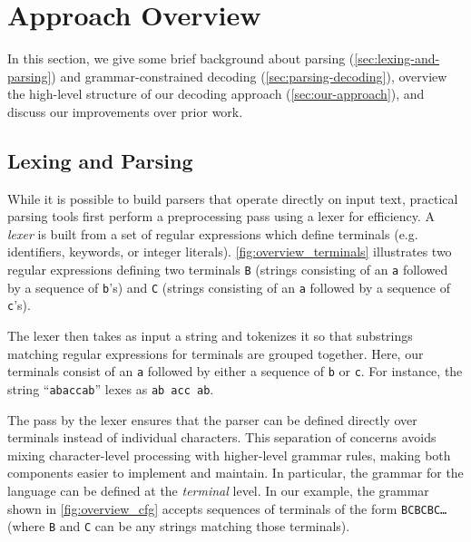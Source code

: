 \section{Approach Overview}
\label{se:overview}


% 
In this section, we give some brief background about parsing (\autoref{sec:lexing-and-parsing}) and grammar-constrained decoding (\autoref{sec:parsing-decoding}), overview the high-level structure of our decoding approach (\autoref{sec:our-approach}), and discuss our improvements over prior work.

\subsection{Lexing and Parsing}
\label{sec:lexing-and-parsing}
While it is possible to build parsers that operate directly on input text, practical parsing tools first perform a preprocessing pass using a lexer for efficiency.
%
A \textit{lexer} is built from a set of regular expressions which define terminals (e.g. identifiers, keywords, or integer literals). 
% 
\autoref{fig:overview_terminals}
illustrates two regular expressions defining two terminals \texttt{B} (strings consisting of an \texttt{a} followed by a sequence of \texttt{b}'s) and \texttt{C} (strings consisting of an \texttt{a} followed by a sequence of \texttt{c}'s).

The lexer then takes as input a string and tokenizes it so that substrings matching regular expressions for terminals are grouped together.
% 
Here, our terminals consist of an \texttt{a} followed by either a sequence of \texttt{b} or \texttt{c}. 
For instance, the string ``\texttt{abaccab}'' lexes as \texttt{ab acc ab}.
%


The pass by the lexer ensures that the parser can be defined directly over terminals instead of individual characters. 
%
This separation of concerns avoids mixing character-level processing with higher-level grammar rules, making both components easier to implement and maintain.
% 
In particular, the grammar for the language can be defined at the \textit{terminal} level.
%
In our example, the grammar shown in \autoref{fig:overview_cfg} accepts sequences of terminals of the form \texttt{BCBCBC\ldots} (where \texttt{B} and \texttt{C} can be any strings matching those terminals).


